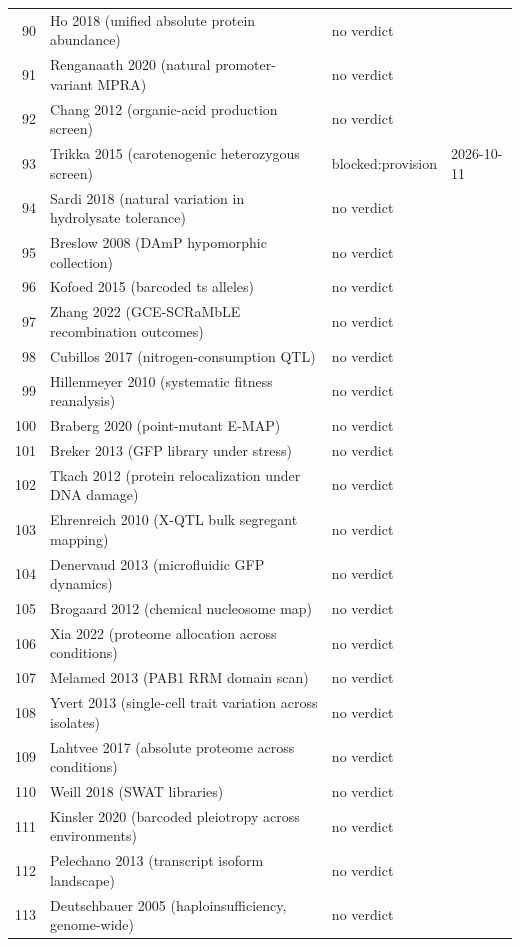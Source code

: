 \begin{longtable}{@{}r L{88mm} L{40mm} L{24mm}@{}}
90 & Ho 2018 (unified absolute protein abundance) & no verdict &  \\
91 & Renganaath 2020 (natural promoter-variant MPRA) & no verdict &  \\
92 & Chang 2012 (organic-acid production screen) & no verdict &  \\
93 & Trikka 2015 (carotenogenic heterozygous screen) & blocked:provision & 2026-10-11 \\
94 & Sardi 2018 (natural variation in hydrolysate tolerance) & no verdict &  \\
95 & Breslow 2008 (DAmP hypomorphic collection) & no verdict &  \\
96 & Kofoed 2015 (barcoded ts alleles) & no verdict &  \\
97 & Zhang 2022 (GCE-SCRaMbLE recombination outcomes) & no verdict &  \\
98 & Cubillos 2017 (nitrogen-consumption QTL) & no verdict &  \\
99 & Hillenmeyer 2010 (systematic fitness reanalysis) & no verdict &  \\
100 & Braberg 2020 (point-mutant E-MAP) & no verdict &  \\
101 & Breker 2013 (GFP library under stress) & no verdict &  \\
102 & Tkach 2012 (protein relocalization under DNA damage) & no verdict &  \\
103 & Ehrenreich 2010 (X-QTL bulk segregant mapping) & no verdict &  \\
104 & Denervaud 2013 (microfluidic GFP dynamics) & no verdict &  \\
105 & Brogaard 2012 (chemical nucleosome map) & no verdict &  \\
106 & Xia 2022 (proteome allocation across conditions) & no verdict &  \\
107 & Melamed 2013 (PAB1 RRM domain scan) & no verdict &  \\
108 & Yvert 2013 (single-cell trait variation across isolates) & no verdict &  \\
109 & Lahtvee 2017 (absolute proteome across conditions) & no verdict &  \\
110 & Weill 2018 (SWAT libraries) & no verdict &  \\
111 & Kinsler 2020 (barcoded pleiotropy across environments) & no verdict &  \\
112 & Pelechano 2013 (transcript isoform landscape) & no verdict &  \\
113 & Deutschbauer 2005 (haploinsufficiency, genome-wide) & no verdict &  \\

\end{longtable}
